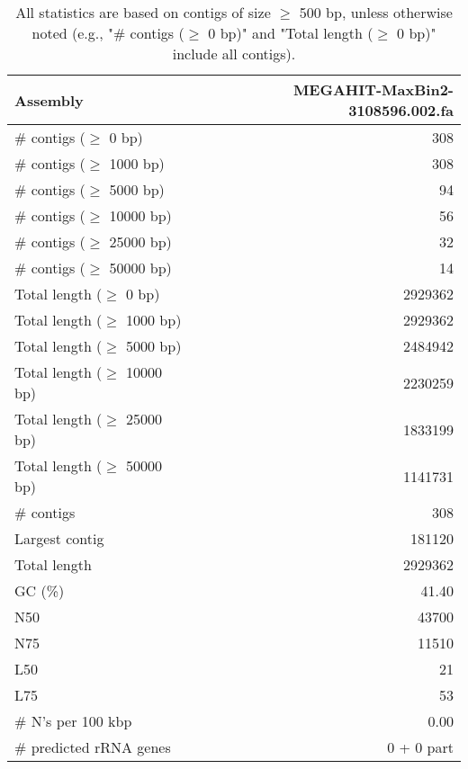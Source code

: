 \documentclass[12pt,a4paper]{article}
\begin{document}
\begin{table}[ht]
\begin{center}
\caption{All statistics are based on contigs of size $\geq$ 500 bp, unless otherwise noted (e.g., "\# contigs ($\geq$ 0 bp)" and "Total length ($\geq$ 0 bp)" include all contigs).}
\begin{tabular}{|l*{1}{|r}|}
\hline
Assembly & MEGAHIT-MaxBin2-3108596.002.fa \\ \hline
\# contigs ($\geq$ 0 bp) & 308 \\ \hline
\# contigs ($\geq$ 1000 bp) & 308 \\ \hline
\# contigs ($\geq$ 5000 bp) & 94 \\ \hline
\# contigs ($\geq$ 10000 bp) & 56 \\ \hline
\# contigs ($\geq$ 25000 bp) & 32 \\ \hline
\# contigs ($\geq$ 50000 bp) & 14 \\ \hline
Total length ($\geq$ 0 bp) & 2929362 \\ \hline
Total length ($\geq$ 1000 bp) & 2929362 \\ \hline
Total length ($\geq$ 5000 bp) & 2484942 \\ \hline
Total length ($\geq$ 10000 bp) & 2230259 \\ \hline
Total length ($\geq$ 25000 bp) & 1833199 \\ \hline
Total length ($\geq$ 50000 bp) & 1141731 \\ \hline
\# contigs & 308 \\ \hline
Largest contig & 181120 \\ \hline
Total length & 2929362 \\ \hline
GC (\%) & 41.40 \\ \hline
N50 & 43700 \\ \hline
N75 & 11510 \\ \hline
L50 & 21 \\ \hline
L75 & 53 \\ \hline
\# N's per 100 kbp & 0.00 \\ \hline
\# predicted rRNA genes & 0 + 0 part \\ \hline
\end{tabular}
\end{center}
\end{table}
\end{document}
